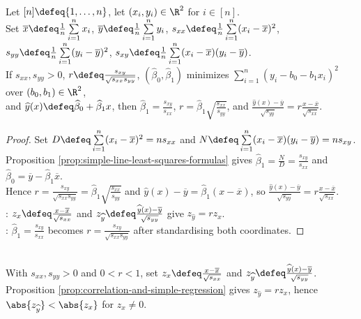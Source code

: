 \begin{proposition} \label{prop:correlation-and-simple-regression} \\
Let $[n]\defeq\{1,\ldots,n\}$, let $(x_i,y_i)\in\R^2$ for $i\in[n]$.\\
Set $\overline{x}\defeq \frac{1}{n}\sum\limits_{i=1}^{n}x_i$, $\overline{y}\defeq \frac{1}{n}\sum\limits_{i=1}^{n}y_i$, $s_{xx}\defeq \frac{1}{n}\sum\limits_{i=1}^{n}(x_i-\overline{x})^2$, $s_{yy}\defeq \frac{1}{n}\sum\limits_{i=1}^{n}(y_i-\overline{y})^2$, $s_{xy}\defeq \frac{1}{n}\sum\limits_{i=1}^{n}(x_i-\overline{x})(y_i-\overline{y})$.\\
If $s_{xx},s_{yy}>0$, $r\defeq\frac{s_{xy}}{\sqrt{s_{xx}s_{yy}}}$, $(\widehat{\beta}_0,\widehat{\beta}_1)$ minimizes $\sum\limits_{i=1}^{n}(y_i-b_0-b_1x_i)^2$ over $(b_0,b_1)\in\R^2$,\\
and $\widehat{y}(x)\defeq\widehat{\beta}_0+\widehat{\beta}_1x$, then $\widehat{\beta}_1=\frac{s_{xy}}{s_{xx}}$, $r=\widehat{\beta}_1\sqrt{\frac{s_{xx}}{s_{yy}}}$, and $\frac{\widehat{y}(x)-\overline{y}}{\sqrt{s_{yy}}}=r\frac{x-\overline{x}}{\sqrt{s_{xx}}}$.
\begin{proof} Set $D\defeq\sum\limits_{i=1}^{n}(x_i-\overline{x})^2=ns_{xx}$ and $N\defeq\sum\limits_{i=1}^{n}(x_i-\overline{x})(y_i-\overline{y})=ns_{xy}$.\\
Proposition \ref{prop:simple-line-least-squares-formulas} gives $\widehat{\beta}_1=\frac{N}{D}=\frac{s_{xy}}{s_{xx}}$ and $\widehat{\beta}_0=\overline{y}-\widehat{\beta}_1\overline{x}$.\\
Hence $r=\frac{s_{xy}}{\sqrt{s_{xx}s_{yy}}}=\widehat{\beta}_1\sqrt{\frac{s_{xx}}{s_{yy}}}$ and $\widehat{y}(x)-\overline{y}=\widehat{\beta}_1(x-\overline{x})$, so $\frac{\widehat{y}(x)-\overline{y}}{\sqrt{s_{yy}}}=r\frac{x-\overline{x}}{\sqrt{s_{xx}}}$.\\
: $z_x\defeq\frac{x-\overline{x}}{\sqrt{s_{xx}}}$ and $z_{\widehat{y}}\defeq\frac{\widehat{y}(x)-\overline{y}}{\sqrt{s_{yy}}}$ give $z_{\widehat{y}}=rz_x$.\\
: $\widehat{\beta}_1=\frac{s_{xy}}{s_{xx}}$ becomes $r=\frac{s_{xy}}{\sqrt{s_{xx}s_{yy}}}$ after standardising both coordinates.
\end{proof}
\end{proposition}

\begin{remark} \label{rem:regression-to-the-mean-simple-line} \\
With $s_{xx},s_{yy}>0$ and $0<r<1$, set $z_x\defeq\frac{x-\overline{x}}{\sqrt{s_{xx}}}$ and $z_{\widehat{y}}\defeq\frac{\widehat{y}(x)-\overline{y}}{\sqrt{s_{yy}}}$.\\
Proposition \ref{prop:correlation-and-simple-regression} gives $z_{\widehat{y}}=rz_x$, hence $\abs{z_{\widehat{y}}}<\abs{z_x}$ for $z_x\neq0$.
\end{remark}
